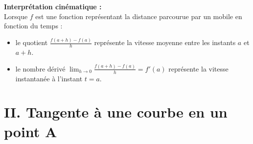\documentclass[11pt,a4paper]{article}
\begin{document}
\textbf{Interprétation cinématique :} \\
Lorsque $f$ est une fonction représentant la distance parcourue par un mobile en fonction du temps :
\begin{itemize}
    \item le quotient $\frac{f(a+h)-f(a)}{h}$ représente la vitesse moyenne entre les instants $a$ et $a+h$.
    \item le nombre dérivé $\displaystyle\lim_{h\to0}$$\frac{f(a+h)-f(a)}{h}=f'(a)$ représente la vitesse instantanée à l'instant $t=a$.
\end{itemize}

\newpage

\section*{II. Tangente à une courbe en un point $\boldsymbol{A}$}
\end{document}
